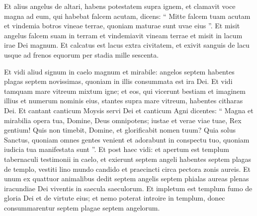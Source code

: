\begin{biblechapter}
\begin{biblechapter}
\begin{biblechapter}
\begin{biblechapter}
\begin{biblechapter}
\begin{biblechapter}
\begin{biblechapter}
\begin{biblechapter}
\begin{biblechapter}
\begin{biblechapter}
\begin{biblechapter}
\begin{biblechapter}
\begin{biblechapter}
\begin{biblechapter}
\verse Et alius angelus de altari, habens potestatem supra ignem, et clamavit voce magna ad eum, qui habebat falcem acutam, dicens: “ Mitte falcem tuam acutam et vindemia botros vineae terrae, quoniam maturae sunt uvae eius ”. 
\verse Et misit angelus falcem suam in terram et vindemiavit vineam terrae et misit in lacum irae Dei magnum. 
\verse Et calcatus est lacus extra civitatem, et exivit sanguis de lacu usque ad frenos equorum per stadia mille sescenta.
 
\begin{biblechapter}
\verse Et vidi aliud signum in caelo magnum et mirabile: angelos septem habentes plagas septem novissimas, quoniam in illis consummata est ira Dei.
 \verse Et vidi tamquam mare vitreum mixtum igne; et eos, qui vicerunt bestiam et imaginem illius et numerum nominis eius, stantes supra mare vitreum, habentes citharas Dei. 
\verse Et cantant canticum Moysis servi Dei et canticum Agni dicentes:
 “ Magna et mirabilia opera tua,
 Domine, Deus omnipotens;
 iustae et verae viae tuae,
 Rex gentium!
 \verse Quis non timebit, Domine,
 et glorificabit nomen tuum?
 Quia solus Sanctus,
 quoniam omnes gentes venient
 et adorabunt in conspectu tuo,
 quoniam iudicia tua manifestata sunt ”.
 \verse Et post haec vidi: et apertum est templum tabernaculi testimonii in caelo, 
 \verse et exierunt septem angeli habentes septem plagas de templo, vestiti lino mundo candido et praecincti circa pectora zonis aureis. 
\verse Et unum ex quattuor animalibus dedit septem angelis septem phialas aureas plenas iracundiae Dei viventis in saecula saeculorum. 
\verse Et impletum est templum fumo de gloria Dei et de virtute eius; et nemo poterat introire in templum, donec consummarentur septem plagae septem angelorum.
 

\end{biblechapter}
\end{biblechapter}
\end{biblechapter}
\end{biblechapter}
\end{biblechapter}
\end{biblechapter}
\end{biblechapter}
\end{biblechapter}
\end{biblechapter}
\end{biblechapter}
\end{biblechapter}
\end{biblechapter}
\end{biblechapter}
\end{biblechapter}
\end{biblechapter}
